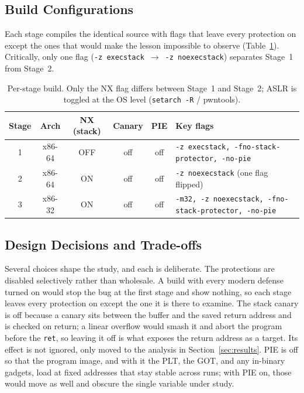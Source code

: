 \documentclass[10pt,twocolumn,letterpaper]{article}
\newcommand{\code}[1]{\texttt{\small #1}}
\begin{document}
\subsection{Build Configurations}
Each stage compiles the identical source with flags that leave every protection
on except the ones that would make the lesson impossible to observe
(Table~\ref{tab:builds}). Critically, only one flag
(\code{-z execstack}~$\rightarrow$~\code{-z noexecstack}) separates Stage~1 from
Stage~2.

\begin{table}[t]
  \centering
  \caption{Per-stage build. Only the NX flag differs between Stage~1 and Stage~2; ASLR is toggled at the OS level (\code{setarch -R} / pwntools).}
  \label{tab:builds}
  \small
  \begin{tabularx}{\textwidth}{@{}c c c c c X@{}}
    \toprule
    \textbf{Stage} & \textbf{Arch} & \textbf{NX (stack)} & \textbf{Canary} & \textbf{PIE} & \textbf{Key flags}\\
    \midrule
    1 & x86-64 & OFF & off & off & \code{-z execstack, -fno-stack-protector, -no-pie}\\
    2 & x86-64 & ON  & off & off & \code{-z noexecstack} (one flag flipped)\\
    3 & x86-32 & ON  & off & off & \code{-m32, -z noexecstack, -fno-stack-protector, -no-pie}\\
    \bottomrule
  \end{tabularx}
\end{table}

\subsection{Design Decisions and Trade-offs}
Several choices shape the study, and each is deliberate. The protections are
disabled selectively rather than wholesale. A build with every modern defense
turned on would stop the bug at the first stage and show nothing, so each stage
leaves every protection on except the one it is there to examine. The stack
canary is off because a canary sits between the buffer and the saved return
address and is checked on return; a linear overflow would smash it and abort the
program before the \code{ret}, so leaving it off is what exposes the return
address as a target. Its effect is not ignored, only moved to the analysis in
Section~\ref{sec:results}. PIE is off so that the program image, and with it the
PLT, the GOT, and any in-binary gadgets, load at fixed addresses that stay stable
across runs; with PIE on, those would move as well and obscure the single
variable under study.
\end{document}
